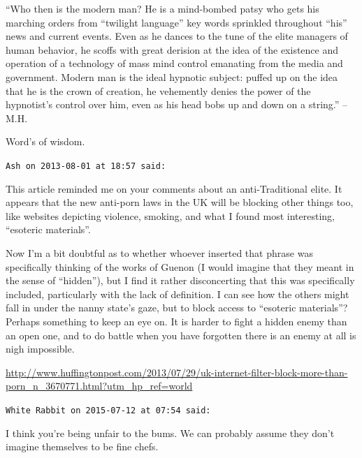 \begin{footnotesize}
\begin{sffamily}
``Who then is the modern man? He is a mind-bombed patsy who gets his marching orders from ``twilight language'' key words sprinkled throughout ``his'' news and current events. Even as he dances to the tune of the elite managers of human behavior, he scoffs with great derision at the idea of the existence and operation of a technology of mass mind control emanating from the media and government. Modern man is the ideal hypnotic subject: puffed up on the idea that he is the crown of creation, he vehemently denies the power of the hypnotist's control over him, even as his head bobs up and down on a string.'' -- M.H.

Word's of wisdom.

\hfill

\texttt{Ash on 2013-08-01 at 18:57 said:}

This article reminded me on your comments about an anti-Traditional elite. It appears that the new anti-porn laws in the UK will be blocking other things too, like websites depicting violence, smoking, and what I found most interesting, ``esoteric materials''.

Now I'm a bit doubtful as to whether whoever inserted that phrase was specifically thinking of the works of Guenon (I would imagine that they meant in the sense of ``hidden''), but I find it rather disconcerting that this was specifically included, particularly with the lack of definition. I can see how the others might fall in under the nanny state's gaze, but to block access to ``esoteric materials''? Perhaps something to keep an eye on. It is harder to fight a hidden enemy than an open one, and to do battle when you have forgotten there is an enemy at all is nigh impossible.

\url{http://www.huffingtonpost.com/2013/07/29/uk-internet-filter-block-more-than-porn\_n\_3670771.html?utm\_hp\_ref=world}


\hfill

\texttt{White Rabbit on 2015-07-12 at 07:54 said:}

I think you're being unfair to the bums. We can probably assume they don't imagine themselves to be fine chefs.


\hfill

\end{sffamily}
\end{footnotesize}

